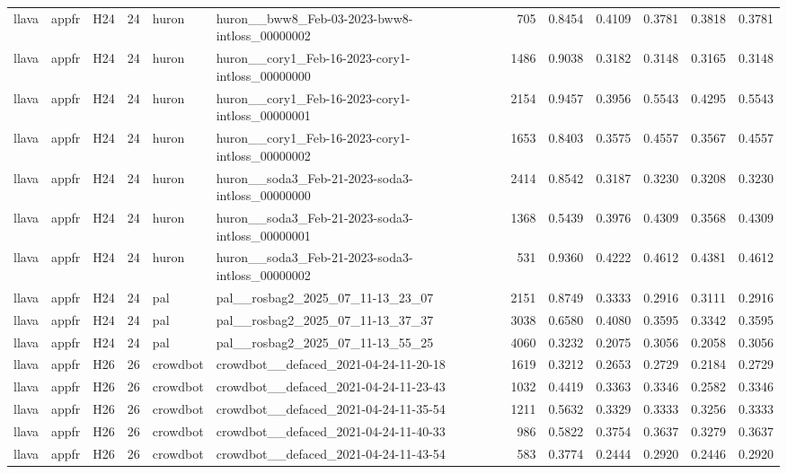 \begin{table}[tbp]
\begin{tabular}{lllrllrrrrrr}
llava & appfr & H24 & 24 & huron & huron\_\_bww8\_Feb-03-2023-bww8-intloss\_00000002 & 705 & 0.8454 & 0.4109 & 0.3781 & 0.3818 & 0.3781 \\
llava & appfr & H24 & 24 & huron & huron\_\_cory1\_Feb-16-2023-cory1-intloss\_00000000 & 1486 & 0.9038 & 0.3182 & 0.3148 & 0.3165 & 0.3148 \\
llava & appfr & H24 & 24 & huron & huron\_\_cory1\_Feb-16-2023-cory1-intloss\_00000001 & 2154 & 0.9457 & 0.3956 & 0.5543 & 0.4295 & 0.5543 \\
llava & appfr & H24 & 24 & huron & huron\_\_cory1\_Feb-16-2023-cory1-intloss\_00000002 & 1653 & 0.8403 & 0.3575 & 0.4557 & 0.3567 & 0.4557 \\
llava & appfr & H24 & 24 & huron & huron\_\_soda3\_Feb-21-2023-soda3-intloss\_00000000 & 2414 & 0.8542 & 0.3187 & 0.3230 & 0.3208 & 0.3230 \\
llava & appfr & H24 & 24 & huron & huron\_\_soda3\_Feb-21-2023-soda3-intloss\_00000001 & 1368 & 0.5439 & 0.3976 & 0.4309 & 0.3568 & 0.4309 \\
llava & appfr & H24 & 24 & huron & huron\_\_soda3\_Feb-21-2023-soda3-intloss\_00000002 & 531 & 0.9360 & 0.4222 & 0.4612 & 0.4381 & 0.4612 \\
llava & appfr & H24 & 24 & pal & pal\_\_rosbag2\_2025\_07\_11-13\_23\_07 & 2151 & 0.8749 & 0.3333 & 0.2916 & 0.3111 & 0.2916 \\
llava & appfr & H24 & 24 & pal & pal\_\_rosbag2\_2025\_07\_11-13\_37\_37 & 3038 & 0.6580 & 0.4080 & 0.3595 & 0.3342 & 0.3595 \\
llava & appfr & H24 & 24 & pal & pal\_\_rosbag2\_2025\_07\_11-13\_55\_25 & 4060 & 0.3232 & 0.2075 & 0.3056 & 0.2058 & 0.3056 \\
llava & appfr & H26 & 26 & crowdbot & crowdbot\_\_defaced\_2021-04-24-11-20-18 & 1619 & 0.3212 & 0.2653 & 0.2729 & 0.2184 & 0.2729 \\
llava & appfr & H26 & 26 & crowdbot & crowdbot\_\_defaced\_2021-04-24-11-23-43 & 1032 & 0.4419 & 0.3363 & 0.3346 & 0.2582 & 0.3346 \\
llava & appfr & H26 & 26 & crowdbot & crowdbot\_\_defaced\_2021-04-24-11-35-54 & 1211 & 0.5632 & 0.3329 & 0.3333 & 0.3256 & 0.3333 \\
llava & appfr & H26 & 26 & crowdbot & crowdbot\_\_defaced\_2021-04-24-11-40-33 & 986 & 0.5822 & 0.3754 & 0.3637 & 0.3279 & 0.3637 \\
llava & appfr & H26 & 26 & crowdbot & crowdbot\_\_defaced\_2021-04-24-11-43-54 & 583 & 0.3774 & 0.2444 & 0.2920 & 0.2446 & 0.2920 \\

\end{tabular}
\end{table}
